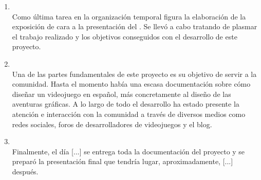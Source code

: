 \begin{enumerate}
\item{} \hfill \\
Como última tarea en la organización temporal figura la elaboración de la exposición de cara a la presentación del . Se llevó a cabo tratando de plasmar el trabajo realizado y los objetivos conseguidos con el desarrollo de este proyecto.

\item{} \hfill \\
Una de las partes fundamentales de este proyecto es su objetivo de servir a la comunidad. Hasta el momento había una escasa documentación sobre cómo diseñar un videojuego en español, más concretamente al diseño de las aventuras gráficas. A lo largo de todo el desarrollo ha estado presente la atención e interacción con la comunidad a través de diversos medios como redes sociales, foros de desarrolladores de videojuegos y el blog.

\item{} \hfill \\
Finalmente, el día [...] se entrega toda la documentación del proyecto y se preparó la presentación final que tendría lugar, aproximadamente, [...] después.

\end{enumerate}

